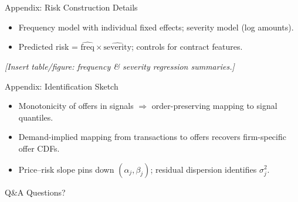 \documentclass[11pt]{beamer}
\begin{document}
\begin{frame}{Appendix: Risk Construction Details}
\justifying
\begin{itemize}
  \item Frequency model with individual fixed effects; severity model (log amounts).
  \item Predicted risk = $\widehat{\text{freq}} \times \widehat{\text{severity}}$; controls for contract features.
\end{itemize}
\vspace{0.75em}
\begin{center}
\textit{[Insert table/figure: frequency \& severity regression summaries.]}
\end{center}
\end{frame}

\begin{frame}{Appendix: Identification Sketch}
\justifying
\begin{itemize}
  \item Monotonicity of offers in signals $\Rightarrow$ order-preserving mapping to signal quantiles.
  \item Demand-implied mapping from transactions to offers recovers firm-specific offer CDFs.
  \item Price--risk slope pins down $(\alpha_j,\beta_j)$; residual dispersion identifies $\sigma_j^2$.
\end{itemize}
\end{frame}

\begin{frame}{Q\&A}
\centering
\Large Questions?
\end{frame}
\end{document}
